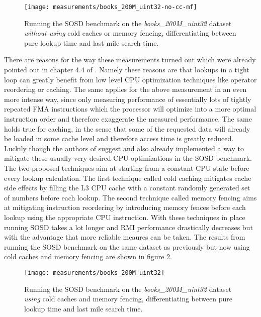 \begin{figure}[!ht]
  \centering
  \texttt{[image: measurements/books\_200M\_uint32-no-cc-mf]}
  \caption[Lookup and last mile search time measures \emph{without using} cold caches and memory fencing]{
    Running the SOSD benchmark on the \emph{books\_200M\_uint32} dataset \emph{without using} cold caches or memory fencing, differentiating between pure lookup time and last mile search time.
  }
  \label{fig:books_200M_uint32-no-cc-mf}
\end{figure}

There are reasons for the way these measurements turned out which were already pointed out in chapter 4.4 of \cite{sosd-vldb}. Namely these reasons are that lookups in a tight loop can greatly benefit from low level CPU optimization techniques like operator reordering or caching. The same applies for the above measurement in an even more intense way, since only measuring performance of essentially lots of tightly repeated FMA instructions which the processor will optimize into a more optimal instruction order and therefore exaggerate the measured performance. The same holds true for caching, in the sense that some of the requested data will already be loaded in some cache level and therefore access time is greatly reduced. Luckily though the authors of \cite{sosd-neurips} suggest and also already implemented a way to mitigate these usually very desired CPU optimizations in the SOSD benchmark. The two proposed techniques aim at starting from a constant CPU state before every lookup calculation. The first technique called cold caching mitigates cache side effects by filling the L3 CPU cache with a constant randomly generated set of numbers before each lookup. The second technique called memory fencing aims at mitigating instruction reordering by introducing memory fences before each lookup using the appropriate CPU instruction. With these techniques in place running SOSD takes a lot longer and RMI performance drastically decreases but with the advantage that more reliable meaures can be taken. The results from running the SOSD benchmark on the same dataset as previously but now using cold caches and memory fencing are shown in figure \ref{fig:books_200M_uint32}.

\begin{figure}[!ht]
  \centering
  \texttt{[image: measurements/books\_200M\_uint32]}
  \caption[Lookup and last mile search time measures \emph{using} cold caches and memory fencing]{
    Running the SOSD benchmark on the \emph{books\_200M\_uint32} dataset \emph{using} cold caches and memory fencing, differentiating between pure lookup time and last mile search time.
  }
  \label{fig:books_200M_uint32}
\end{figure}

